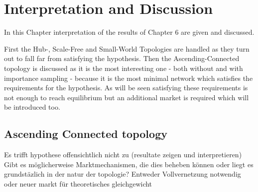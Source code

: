 \documentclass[Bachelorarbeit.tex]{subfiles}
\begin{document}
\graphicspath{{./figures/interpretation/}}	%

\chapter{Interpretation and Discussion}

In this Chapter interpretation of the results of Chapter 6 are given and discussed.

First the Hub-, Scale-Free and Small-World Topologies are handled as they turn out to fall far from satisfying the hypothesis. Then the Ascending-Connected topology is discussed as it is the most interesting one - both without and with importance sampling - because it is the most minimal network which satisfies the requirements for the hypothesis. As will be seen satisfying these requirements is not enough to reach equilibrium but an additional market is required which will be introduced too.

\section{Ascending Connected topology}

Es trifft hypothese offensichtlich nicht zu (resultate zeigen und interpretieren)
		Gibt es möglicherweise Marktmechanismen, die dies beheben können oder liegt es grundstäzlich in der natur der topologie?
		Entweder Vollvernetzung notwendig oder neuer markt für theoretisches gleichgewicht
		
\end{document}
